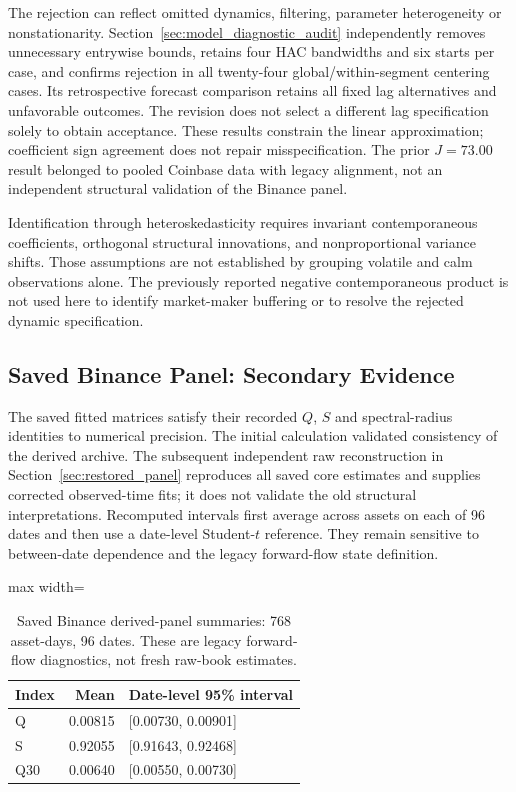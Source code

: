\documentclass[12pt]{article}
\theoremstyle{definition}
\theoremstyle{remark}
\begin{document}
The rejection can reflect omitted dynamics, filtering, parameter heterogeneity or nonstationarity. Section~\ref{sec:model_diagnostic_audit} independently removes unnecessary entrywise bounds, retains four HAC bandwidths and six starts per case, and confirms rejection in all twenty-four global/within-segment centering cases. Its retrospective forecast comparison retains all fixed lag alternatives and unfavorable outcomes. The revision does not select a different lag specification solely to obtain acceptance. These results constrain the linear approximation; coefficient sign agreement does not repair misspecification. The prior $J=73.00$ result belonged to pooled Coinbase data with legacy alignment, not an independent structural validation of the Binance panel.

Identification through heteroskedasticity requires invariant contemporaneous coefficients, orthogonal structural innovations, and nonproportional variance shifts. Those assumptions are not established by grouping volatile and calm observations alone. The previously reported negative contemporaneous product is not used here to identify market-maker buffering or to resolve the rejected dynamic specification.

\subsection{Saved Binance Panel: Secondary Evidence}
The saved fitted matrices satisfy their recorded $Q$, $S$ and spectral-radius identities to numerical precision. The initial calculation validated consistency of the derived archive. The subsequent independent raw reconstruction in Section~\ref{sec:restored_panel} reproduces all saved core estimates and supplies corrected observed-time fits; it does not validate the old structural interpretations. Recomputed intervals first average across assets on each of 96 dates and then use a date-level Student-$t$ reference. They remain sensitive to between-date dependence and the legacy forward-flow state definition.

\begin{table}[htbp]
\centering\small
\caption{Saved Binance derived-panel summaries: 768 asset-days, 96 dates. These are legacy forward-flow diagnostics, not fresh raw-book estimates.}
\label{tab:panel_revised}
\begin{adjustbox}{max width=\textwidth}
\begin{tabular}{lrl}\toprule
Index & Mean & Date-level 95\% interval \\\midrule
Q & 0.00815 & [0.00730, 0.00901] \\
S & 0.92055 & [0.91643, 0.92468] \\
Q30 & 0.00640 & [0.00550, 0.00730] \\
\bottomrule\end{tabular}
\end{adjustbox}
\end{table}
\end{document}
